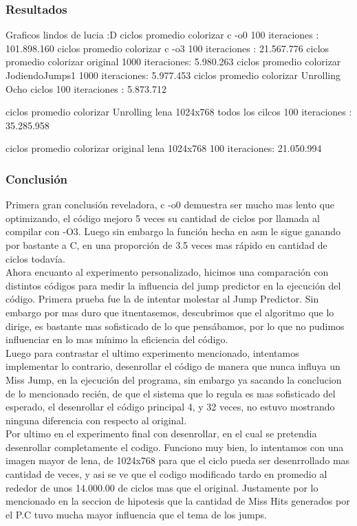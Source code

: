 \subsubsection{Resultados}
	Graficos lindos de lucia :D
	ciclos promedio colorizar c -o0 100 iteraciones : 101.898.160
	ciclos promedio colorizar c -o3 100 iteraciones : 21.567.776
	ciclos promedio colorizar original 1000 iteraciones: 5.980.263
	ciclos promedio colorizar JodiendoJumps1 1000 iteraciones: 5.977.453
	ciclos promedio colorizar Unrolling Ocho ciclos 100 iteraciones : 5.873.712
	
	
	
	ciclos promedio colorizar Unrolling lena 1024x768
	 todos los cilcos 100 iteraciones : 35.285.958
	
	ciclos promedio colorizar original lena 1024x768 100 iteraciones:	21.050.994
	
	
	
\subsubsection{Conclusión}
 Primera gran conclusión reveladora, c -o0 demuestra ser mucho mas lento que optimizando, el código mejoro 5 veces su cantidad de ciclos por llamada al compilar con -O3.
  Luego sin embargo la función hecha en  asm le sigue ganando por bastante a C, en una proporción de 3.5 veces mas rápido en cantidad de ciclos todavía.\\
  Ahora encuanto al experimento personalizado, hicimos una comparación con distintos códigos para medir la influencia del jump predictor en la ejecución del código. Primera prueba fue la de intentar molestar al Jump Predictor. Sin embargo por mas duro que itnentasemos, descubrimos que el algoritmo que lo dirige, es bastante mas sofisticado de lo que pensábamos, por lo que no pudimos influenciar en lo mas mínimo la eficiencia del código. \\
   Luego para contrastar el ultimo experimento mencionado, intentamos implementar lo contrario, desenrollar el código de manera que nunca influya un Miss Jump, en la ejecución del programa, sin embargo ya sacando la conclucion de lo mencionado recién, de que el sistema que lo regula es mas sofisticado del esperado, el desenrollar el código principal 4, y 32 veces, no estuvo mostrando ninguna diferencia con respecto al original. \\ 
   Por ultimo en el experimento final con desenrollar, en el cual se pretendia desenrollar completamente el codigo. Funciono muy bien, lo intentamos con una imagen mayor de lena, de 1024x768 para que el ciclo pueda ser desenrrollado mas cantidad de veces, y asi se ve que el codigo modificado tardo en promedio al rededor de unos 14.000.00 de ciclos mas que el original. Justamente por lo mencionado en la seccion de hipotesis que la cantidad de Miss Hits generados por el P.C tuvo mucha mayor influencia que el tema de los jumps.
